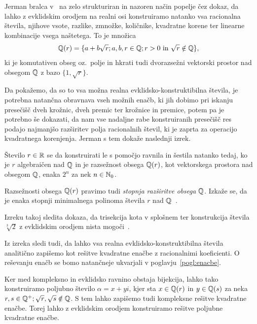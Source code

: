 Jerman bralca v~\cite{jerman1998} na zelo strukturiran in nazoren način popelje čez dokaz, da lahko z evklidskim orodjem na realni osi konstruiramo natanko vsa racionalna števila, njihove vsote, razlike, zmnožke, količnike, kvadratne korene ter linearne kombinacije vsega naštetega. To je množica
$$
    \mathbb Q(r) = \{ a + b \sqrt{r}; a, b, r \in \mathbb Q; r > 0 \text{ in } \sqrt{r} \notin \mathbb Q \},
$$
ki je komutativen obseg oz.\ polje in hkrati tudi dvorazsežni vektorski prostor nad obsegom $\mathbb Q$ z bazo $ \{1, \sqrt{r} \} $.

Da pokažemo, da so to vsa možna realna evklidsko-konstruktibilna števila, je potrebna natančna obravnava vseh možnih enačb, ki jih dobimo pri iskanju presečišč dveh krožnic, dveh premic ter krožnice in premice, potem pa je potrebno še dokazati, da nam vse nadaljne rabe konstruiranih presečišč res podajo najmanjšo razširitev polja racionalnih števil, ki je zaprta za operacijo kvadratnega korenjenja. Jerman s tem dokaže naslednji izrek.

\begin{izrek}
    \label{izr:evkl_konstr}
    Število $r \in \mathbb R$ se da konstruirati le s pomočjo ravnila in šestila natanko tedaj, ko je $r$ algebraičen nad $\mathbb Q$ in je razsežnost obsega $\mathbb Q(r)$, kot vektorskega prostora nad obsegom $\mathbb Q$, enaka $2^n$ za nek $n \in \mathbb N_0$.
\end{izrek}

\begin{opomba}
    \label{op:razseznost_obsega_evkl}
    Razsežnosti obsega $\mathbb Q(r)$ pravimo tudi \emph{stopnja razširitve obsega $\mathbb Q$}. Izkaže se, da je enaka stopnji minimalnega polinoma števila $r$ nad $\mathbb Q$~\cite[str.\ 77]{jerman1998}.
\end{opomba}

Izreku takoj sledita dokaza, da trisekcija kota v splošnem ter konstrukcija števila $ \sqrt[3]{2} $ z evklidskim orodjem nista mogoči~\cite[str.\ 77--78]{jerman1998}.

Iz izreka sledi tudi, da lahko vsa realna evklidsko-konstruktibilna števila analitično zapišemo kot rešitve kvadratne enačbe z racionalnimi koeficienti. O reševanju enačb se bomo natančneje ukvarjali v poglavju~\ref{pogl:enacbe}.

Ker med kompleksno in evklidsko ravnino obstaja bijekcija, lahko tako konstruiramo poljubno število $\alpha = x + y i$, kjer sta $x \in \mathbb Q(r)$ in $y \in \mathbb Q(s)$ za neka $r, s \in \mathbb Q^+; \sqrt{r}, \sqrt{s} \notin \mathbb Q$. S tem lahko zapišemo tudi kompleksne rešitve kvadratne enačbe. Torej lahko z evklidskim orodjem konstruiramo rešitve poljubne kvadratne enačbe.

